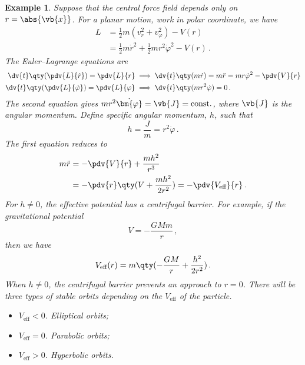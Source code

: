 \documentclass{article}
\theoremstyle{plain}\theoremheaderfont{\normalfont\itshape}\theorembodyfont{\rmfamily}\theoremseparator{.}\newtheorem*{rem}{Remark}\newtheorem*{ex}{Example}\newtheorem*{proof}{Proof}\newtheorem*{altp}{Alternative proof}
\theoremstyle{plain}\theoremheaderfont{\normalfont\bfseries}\theorembodyfont{\rmfamily}\theoremseparator{.}\newtheorem{thm}{Theorem}[section]\newtheorem{lem}[thm]{Lemma}\newtheorem{prop}[thm]{Proposition}\newtheorem*{cor}{Corollary}\newtheorem{defn}[thm]{Definition}\newtheorem{clm}[thm]{Claim}\newtheorem{clminproof}{Claim}
\theoremstyle{break}\theoremheaderfont{\normalfont\itshape}\theorembodyfont{\rmfamily}\theoremseparator{.\medskip}\newtheorem*{proofskip}{Proof}\newtheorem*{exs}{Examples}\newtheorem*{rems}{Remarks}
\theoremstyle{break}\theoremheaderfont{\normalfont\bfseries}\theorembodyfont{\rmfamily}\theoremseparator{.\medskip}\newtheorem{lemskip}[thm]{Lemma}\newtheorem{defnskip}[thm]{Definition}\newtheorem{propskip}[thm]{Proposition}\newtheorem{thmskip}[thm]{Theorem}
\numberwithin{equation}{section}
\begin{document}
	\begin{ex}
		Suppose that the central force field depends only on \(r=\abs{\vb{x}}\). For a planar motion, work in polar coordinate, we have
		\begin{align*}
			L&=\frac{1}{2}m(v_r^2+v_\varphi^2)-V(r)\\
			&=\frac{1}{2}m\dot{r}^2+\frac{1}{2}mr^2\dot{\varphi}^2-V(r)\,.
		\end{align*}
		The Euler--Lagrange equations are
		\begin{align*}
			\dv{t}\qty(\pdv{L}{\dot{r}})=\pdv{L}{r} &\implies \dv{t}\qty(m\dot{r})=m\ddot{r}=mr\dot{\varphi}^2-\pdv{V}{r}\\
			\dv{t}\qty(\pdv{L}{\dot{\varphi}})=\pdv{L}{\varphi} &\implies \dv{t}\qty(mr^2\dot{\varphi})=0\,.
		\end{align*}
		The second equation gives \(mr^2\dot{\bm{\varphi}}=\vb{J}=\text{const.}\), where \(\vb{J}\) is the angular momentum. Define specific angular momentum, \(h\), such that
		\[h=\frac{J}{m}=r^2\dot{\varphi}\,.\]
		The first equation reduces to
		\begin{align*}
			m\ddot{r}&=-\pdv{V}{r}+\frac{mh^2}{r^3}\\
			&=-\pdv{r}\qty(V+\frac{mh^2}{2r^2})=-\pdv{V_{\text{eff}}}{r}\,.
		\end{align*}
		For \(h\ne 0\), the effective potential has a centrifugal barrier. For example, if the gravitational potential
		\[V=-\frac{GMm}{r}\,,\]
		then we have
		\[V_{\text{eff}}(r)=m\qty(-\frac{GM}{r}+\frac{h^2}{2r^2})\,.\]
		When \(h\ne 0\), the centrifugal barrier prevents an approach to \(r=0\). There will be three types of stable orbits depending on the \(V_\text{eff}\) of the particle.
		\begin{itemize}[topsep=0pt]
			\item \(V_\text{eff}<0\). Elliptical orbits;
			\item \(V_\text{eff}=0\). Parabolic orbits;
			\item \(V_\text{eff}>0\). Hyperbolic orbits.
		\end{itemize}
	\end{ex}
\end{document}
